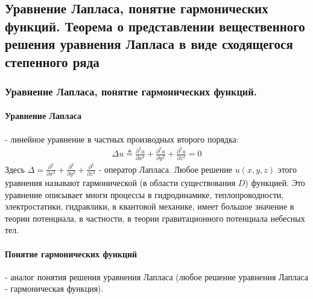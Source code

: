 \documentclass[12pt]{extarticle}
\begin{document}
\subsection{Уравнение Лапласа, понятие гармонических функций. Теорема о
представлении вещественного решения уравнения Лапласа в виде сходящегося
степенного ряда}
\subsubsection{Уравнение Лапласа, понятие гармонических функций.}
\paragraph{Уравнение Лапласа} - линейное уравнение в частных производных
второго порядка:
\begin{eqnarray*}
\Delta u \triangleq
\frac{\partial^{2}u}{\partial x^{2}}
+\frac{\partial^{2}u}{\partial y^{2}}
+\frac{\partial^{2}u}{\partial z^{2}}=0
\end{eqnarray*}
Здесь $\Delta = \frac{\partial^{2}}{\partial
x^{2}}+\frac{\partial^{2}}{\partial y^{2}}
+\frac{\partial^{2}}{\partial z^{2}}$ - оператор Лапласа. Любое решение
$u(x,y,z)$ этого уравнения называют гармонической (в области
существования $D$) функцией. Это уравнение описывает многи процессы в
гидродинамике, теплопроводности, электростатики, гидравлики, в квантовой
механике, имеет большое значение в теории потенциала, в частности, в
теории гравитационного потенциала небесных тел.

\paragraph{Понятие гармонических функций} -
аналог понятия решения уравнения Лапласа (любое решение уравнения
Лапласа - гармоническая функция).
\end{document}
